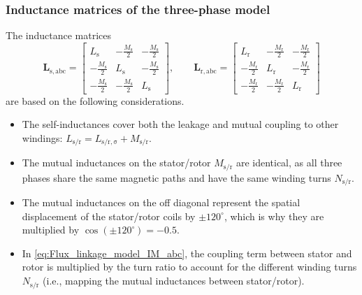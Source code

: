 \begin{frame}
	\frametitle{Inductance matrices of the three-phase model}
    The inductance matrices
    $$\renewcommand*{\arraystretch}{1.15} 
    \bm{L}_\mathrm{s,abc} = \begin{bmatrix}
        L_\mathrm{s} & -\frac{M_\mathrm{s}}{2} & -\frac{M_\mathrm{s}}{2}\\
        -\frac{M_\mathrm{s}}{2} & L_\mathrm{s} & -\frac{M_\mathrm{s}}{2}\\
        -\frac{M_\mathrm{s}}{2} & -\frac{M_\mathrm{s}}{2} & L_\mathrm{s}
    \end{bmatrix}, \qquad  \bm{L}_\mathrm{r,abc} = \begin{bmatrix}
        L_\mathrm{r} & -\frac{M_\mathrm{r}}{2} & -\frac{M_\mathrm{r}}{2}\\
        -\frac{M_\mathrm{r}}{2} & L_\mathrm{r} & -\frac{M_\mathrm{r}}{2}\\
        -\frac{M_\mathrm{r}}{2} & -\frac{M_\mathrm{r}}{2} & L_\mathrm{r}
    \end{bmatrix}$$
    are based on the following considerations. 
    \begin{itemize}
        \item The self-inductances cover both the leakage and mutual coupling to other windings: $L_\mathrm{s/r}=L_\mathrm{s/r, \sigma} + M_\mathrm{s/r}$.
        \item<2-> The mutual inductances on the stator/rotor $M_\mathrm{s/r}$ are identical, as all three phases share the same magnetic paths and have the same winding turns $N_\mathrm{s/r}$.
        \item<3-> The mutual inductances on the off diagonal represent the spatial displacement of the stator/rotor coils by $\pm 120^\circ$, which is why they are multiplied by $\cos(\pm 120^\circ)=-0.5$.
        \item<4-> In \eqref{eq:Flux_linkage_model_IM_abc}, the coupling term between stator and rotor is multiplied by the turn ratio to account for the different winding turns $N_\mathrm{s/r}$ (i.e., mapping the mutual inductances between stator/rotor).
    \end{itemize}
\end{frame}

